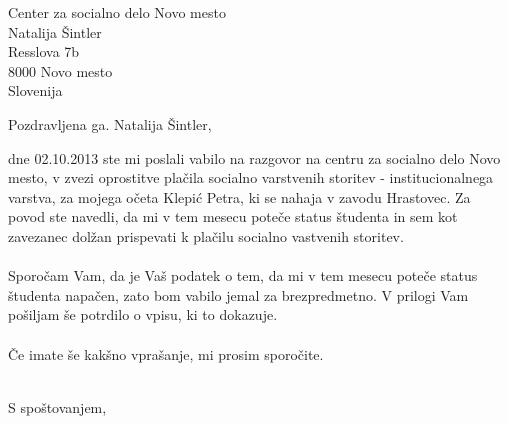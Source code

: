 \documentclass[a4paper]{scrlttr2}
\begin{document}
 
\begin{letter}{Center za socialno delo Novo mesto \\ Natalija Šintler \\ Resslova 7b \\ 8000 Novo mesto \\ Slovenija}
 

\opening{Pozdravljena ga. Natalija Šintler,}
 
dne 02.10.2013 ste mi poslali vabilo na razgovor na centru za socialno delo Novo mesto, v zvezi oprostitve plačila socialno varstvenih storitev - institucionalnega varstva, za mojega očeta Klepić Petra, ki se nahaja v zavodu Hrastovec. Za povod ste navedli, da mi v tem mesecu poteče status študenta in sem kot zavezanec dolžan prispevati k plačilu socialno vastvenih storitev.
\\
\\
Sporočam Vam, da je Vaš podatek o tem, da mi v tem mesecu poteče status študenta napačen, zato bom vabilo jemal za brezpredmetno. V prilogi Vam pošiljam še potrdilo o vpisu, ki to dokazuje.
\\
\\
Če imate še kakšno vprašanje, mi prosim sporočite.
\\
\\
\closing{S spoštovanjem,}

 
\end{letter}
 
\end{document}
